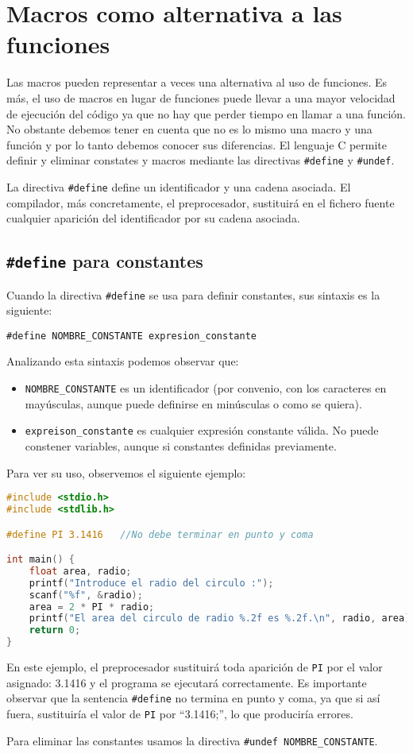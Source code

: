 \section{Macros como alternativa a las funciones}{
Las macros pueden representar a veces una alternativa al uso de funciones. Es más, el uso de macros en lugar de funciones puede llevar a una mayor velocidad de ejecución del código ya que no hay que perder tiempo en llamar a una función. No obstante debemos tener en cuenta que no es lo mismo una macro y una función y por lo tanto debemos conocer sus diferencias. El lenguaje C permite definir y eliminar constates y macros mediante las directivas \texttt{\#define} y \texttt{\#undef}.

La directiva \texttt{\#define} define un identificador y una cadena asociada. El compilador, más concretamente, el preprocesador, sustituirá en el fichero fuente cualquier aparición del identificador por su cadena asociada.
\subsection{\texttt{\#define} para constantes}
Cuando la directiva \texttt{\#define} se usa para definir constantes, sus sintaxis es la siguiente:

\texttt{\#define NOMBRE\_CONSTANTE expresion\_constante}

Analizando esta sintaxis podemos observar que:
\begin{itemize}
	\item \texttt{NOMBRE\_CONSTANTE} es un identificador (por convenio, con los caracteres en mayúsculas, aunque puede definirse en minúsculas o como se quiera).
	\item \texttt{expreison\_constante} es cualquier expresión constante válida. No puede constener variables, aunque si constantes definidas previamente.
\end{itemize}
Para ver su uso, observemos el siguiente ejemplo:
\begin{Ejemplo}
\begin{lstlisting}[language=C]
#include <stdio.h>
#include <stdlib.h>

#define PI 3.1416	//No debe terminar en punto y coma

int main() {
    float area, radio;
    printf("Introduce el radio del circulo :");
    scanf("%f", &radio);
    area = 2 * PI * radio;
    printf("El area del circulo de radio %.2f es %.2f.\n", radio, area);
    return 0;
}
\end{lstlisting}
\Explicacion
En este ejemplo, el preprocesador sustituirá toda aparición de \texttt{PI} por el valor asignado: 3.1416 y el programa se ejecutará correctamente. Es importante observar que la sentencia \texttt{\#define} no termina en punto y coma, ya que si así fuera, sustituiría el valor de \texttt{PI} por ``3.1416;'', lo que produciría errores.
\end{Ejemplo}
\Nota
Para eliminar las constantes usamos la directiva \texttt{\#undef NOMBRE\_CONSTANTE}.
}
